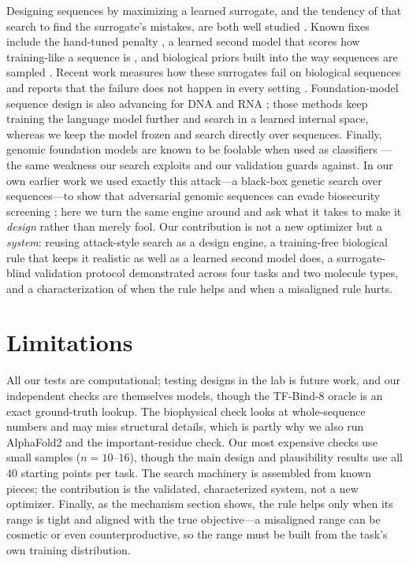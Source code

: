 \documentclass{article}
\begin{document}
Designing sequences by maximizing a learned surrogate, and the tendency of that search to
find the surrogate's mistakes, are both well studied
\citep{trabucco2021coms, trabucco2022designbench, fu2021nemo}. Known fixes include the
hand-tuned penalty \citep{trabucco2021coms}, a learned second model that scores how
training-like a sequence is \citep{yao2024gabo}, and biological priors built into the way
sequences are sampled \citep{prospero2025}. Recent work measures how these surrogates fail
on biological sequences \citep{overconfident2025} and reports that the failure does not
happen in every setting \citep{yang2025taco}. Foundation-model sequence design is also
advancing for DNA and RNA \citep{zhang2026aptamer, wang2024aptadiff}; those methods
keep training the language model further and search in a learned internal space, whereas we
keep the model frozen and search directly over sequences. Finally, genomic foundation models
are known to be foolable when used as classifiers
\citep{yoo2024dnalm, luo2025genoarmory, safegenes2025, krishnan2026adversarial}---the
same weakness our search exploits and our validation guards against. In our own earlier work
we used exactly this attack---a black-box genetic search over sequences---to show that
adversarial genomic sequences can evade biosecurity screening \citep{krishnan2026adversarial};
here we turn the same engine around and ask what it takes to make it \emph{design} rather
than merely fool. Our contribution is not a new optimizer but a
\emph{system}: reusing attack-style search as a design engine, a training-free biological
rule that keeps it realistic as well as a learned second model does, a surrogate-blind
validation protocol demonstrated across four tasks and two molecule types, and a
characterization of when the rule helps and when a misaligned rule hurts.

\section{Limitations}

All our tests are computational; testing designs in the lab is future work, and our
independent checks are themselves models, though the TF-Bind-8 oracle is an exact
ground-truth lookup. The biophysical
check looks at whole-sequence numbers and may miss structural details, which is partly why
we also run AlphaFold2 and the important-residue check. Our most expensive checks use small
samples ($n=10$--$16$), though the main design and plausibility results use all 40 starting
points per task. The search machinery is assembled from known pieces; the contribution is
the validated, characterized system, not a new optimizer. Finally, as the mechanism section
shows, the rule helps only when its range is tight and aligned with the true objective---a
misaligned range can be cosmetic or even counterproductive, so the range must be built from
the task's own training distribution.
\end{document}
